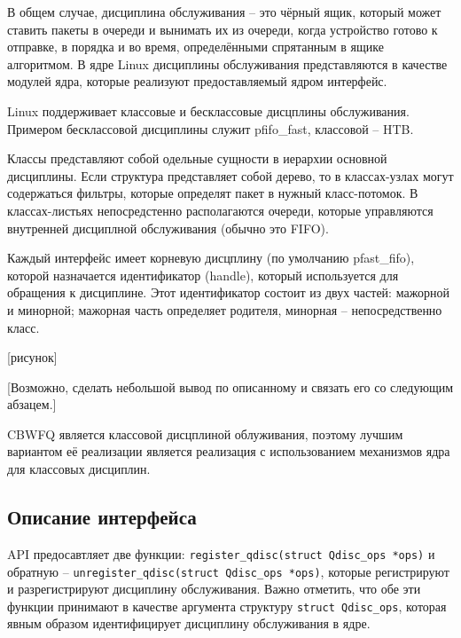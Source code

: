 
	В общем случае, дисциплина обслуживания -- это чёрный ящик, который может
	ставить пакеты в очереди и вынимать их из очереди, когда устройство
	готово к отправке, в порядка и во время, определёнными спрятанным в ящике
	алгоритмом. В ядре Linux дисциплины обслуживания представляются в качестве
	модулей ядра, которые реализуют предоставляемый ядром интерфейс.

	Linux поддерживает классовые и бесклассовые дисцплины обслуживания. Примером
	бесклассовой дисциплины служит pfifo\_fast, классовой -- HTB.


	Классы представляют собой одельные сущности в иерархии основной дисциплины.
	Если структура представляет собой дерево, то в классах-узлах могут содержаться
	фильтры, которые определят пакет в нужный класс-потомок. В классах-листьях
	непосредстенно располагаются очереди, которые управляются внутренней дисциплной
	обслуживания (обычно это FIFO). 

	Каждый интерфейс имеет корневую дисцплину (по умолчанию pfast\_fifo), которой
	назначается идентификатор (handle), который используется для обращения к дисциплине.
	Этот идентификатор состоит из двух частей: мажорной и минорной; мажорная
	часть определяет родителя, минорная -- непосредственно класс.

	[рисунок]

	[Возможно, сделать небольшой вывод по описанному и связать его со следующим абзацем.]

	CBWFQ является классовой дисцплиной облуживания, поэтому лучшим вариантом
	её реализации является реализация с использованием механизмов ядра для
	классовых дисциплин.

	\subsection{Описание интерфейса}

	API предосавтляет две функции: \lstinline{register_qdisc(struct Qdisc_ops *ops)}
	и обратную -- \lstinline{unregister_qdisc(struct Qdisc_ops *ops)}, которые регистрируют
	и разрегистрируют дисциплину обслуживания. Важно отметить, что обе эти
	функции принимают в качестве аргумента структуру \lstinline{struct Qdisc_ops},
	которая явным образом идентифицирует дисциплину обслуживания в ядре.

